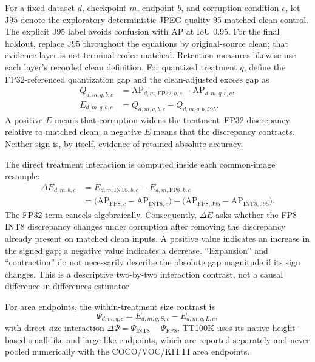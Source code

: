 \documentclass[10pt]{article}
\newcommand{\AP}{\mathrm{AP}}
\newcommand{\Jclean}{\mathrm{J95}}
\newcommand{\DeltaE}{\Delta E}
\newcommand{\DeltaPsi}{\Delta\Psi}
\begin{document}
For a fixed dataset $d$, checkpoint $m$, endpoint $b$, and corruption condition
$c$, let $\Jclean$ denote the exploratory deterministic JPEG-quality-95 matched-clean control. The explicit $\Jclean$ label avoids confusion with AP at IoU 0.95. For the final holdout, replace $\Jclean$ throughout the equations by original-source clean; that evidence layer is not terminal-codec matched. Retention measures likewise use each layer's recorded clean definition.
For quantized treatment $q$, define the FP32-referenced quantization gap and the
clean-adjusted excess gap as
\begin{align}
Q_{d,m,q,b,c}
 &= \AP_{d,m,\mathrm{FP32},b,c}-\AP_{d,m,q,b,c},\\
E_{d,m,q,b,c}
 &= Q_{d,m,q,b,c}-Q_{d,m,q,b,\Jclean}.
\end{align}
A positive $E$ means that corruption widens the treatment--FP32 discrepancy
relative to matched clean; a negative $E$ means that the discrepancy contracts.
Neither sign is, by itself, evidence of retained absolute accuracy.

The direct treatment interaction is computed inside each common-image resample:
\begin{align}
\DeltaE_{d,m,b,c}
 &= E_{d,m,\mathrm{INT8},b,c}-E_{d,m,\mathrm{FP8},b,c}\\
 &= \bigl(\AP_{\mathrm{FP8},c}-\AP_{\mathrm{INT8},c}\bigr)
  -\bigl(\AP_{\mathrm{FP8},\Jclean}-\AP_{\mathrm{INT8},\Jclean}\bigr).
\end{align}
The FP32 term cancels algebraically. Consequently, $\DeltaE$ asks whether the
FP8--INT8 discrepancy changes under corruption after removing the discrepancy
already present on matched clean inputs. A positive value indicates an increase
in the signed gap; a negative value indicates a decrease. ``Expansion'' and
``contraction'' do not necessarily describe the absolute gap magnitude if its
sign changes. This is a descriptive two-by-two
interaction contrast, not a causal difference-in-differences estimator.

For area endpoints, the within-treatment size contrast is
\begin{equation}
\Psi_{d,m,q,c}=E_{d,m,q,S,c}-E_{d,m,q,L,c},
\end{equation}
with direct size interaction $\DeltaPsi=\Psi_{\mathrm{INT8}}-
\Psi_{\mathrm{FP8}}$. TT100K uses its native height-based small-like and
large-like endpoints, which are reported separately and never pooled
numerically with the COCO/VOC/KITTI area endpoints.
\end{document}
